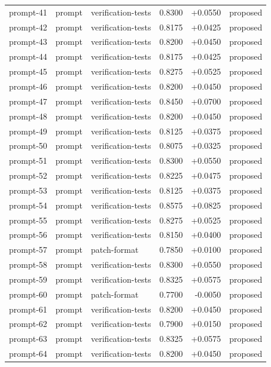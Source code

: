 \begin{center}
\begin{longtable}{llp{5.2cm}rrl}
prompt-41 & prompt & verification-tests & 0.8300 & +0.0550 & proposed \\
prompt-42 & prompt & verification-tests & 0.8175 & +0.0425 & proposed \\
prompt-43 & prompt & verification-tests & 0.8200 & +0.0450 & proposed \\
prompt-44 & prompt & verification-tests & 0.8175 & +0.0425 & proposed \\
prompt-45 & prompt & verification-tests & 0.8275 & +0.0525 & proposed \\
prompt-46 & prompt & verification-tests & 0.8200 & +0.0450 & proposed \\
prompt-47 & prompt & verification-tests & 0.8450 & +0.0700 & proposed \\
prompt-48 & prompt & verification-tests & 0.8200 & +0.0450 & proposed \\
prompt-49 & prompt & verification-tests & 0.8125 & +0.0375 & proposed \\
prompt-50 & prompt & verification-tests & 0.8075 & +0.0325 & proposed \\
prompt-51 & prompt & verification-tests & 0.8300 & +0.0550 & proposed \\
prompt-52 & prompt & verification-tests & 0.8225 & +0.0475 & proposed \\
prompt-53 & prompt & verification-tests & 0.8125 & +0.0375 & proposed \\
prompt-54 & prompt & verification-tests & 0.8575 & +0.0825 & proposed \\
prompt-55 & prompt & verification-tests & 0.8275 & +0.0525 & proposed \\
prompt-56 & prompt & verification-tests & 0.8150 & +0.0400 & proposed \\
prompt-57 & prompt & patch-format & 0.7850 & +0.0100 & proposed \\
prompt-58 & prompt & verification-tests & 0.8300 & +0.0550 & proposed \\
prompt-59 & prompt & verification-tests & 0.8325 & +0.0575 & proposed \\
prompt-60 & prompt & patch-format & 0.7700 & -0.0050 & proposed \\
prompt-61 & prompt & verification-tests & 0.8200 & +0.0450 & proposed \\
prompt-62 & prompt & verification-tests & 0.7900 & +0.0150 & proposed \\
prompt-63 & prompt & verification-tests & 0.8325 & +0.0575 & proposed \\
prompt-64 & prompt & verification-tests & 0.8200 & +0.0450 & proposed \\

\end{longtable}
\end{center}
